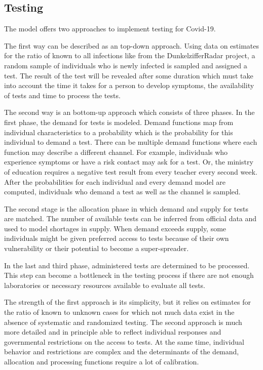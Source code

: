 \subsection{Testing} %
\label{sub:testing}

The model offers two approaches to implement testing for Covid-19.

The first way can be described as an top-down approach. Using data on estimates for the ratio of known to all infections like from the DunkelzifferRadar project\footnotemark, a random sample of individuals who is newly infected is sampled and assigned a test. The result of the test will be revealed after some duration which must take into account the time it takes for a person to develop symptoms, the availability of tests and time to process the tests.


The second way is an bottom-up approach which consists of three phases. In the first phase, the demand for tests is modeled. Demand functions map from individual characteristics to a probability which is the probability for this individual to demand a test. There can be multiple demand functions where each function may describe a different channel. For example, individuals who experience symptoms or have a risk contact may ask for a test. Or, the ministry of education requires a negative test result from every teacher every second week. After the probabilities for each individual and every demand model are computed, individuals who demand a test as well as the channel is sampled.

The second stage is the allocation phase in which demand and supply for tests are matched. The number of available tests can be inferred from official data and used to model shortages in supply. When demand exceeds supply, some individuals might be given preferred access to tests because of their own vulnerability or their potential to become a super-spreader.

In the last and third phase, administered tests are determined to be processed. This step can become a bottleneck in the testing process if there are not enough laboratories or necessary resources available to evaluate all tests.

The strength of the first approach is its simplicity, but it relies on estimates for the ratio of known to unknown cases for which not much data exist in the absence of systematic and randomized testing. The second approach is much more detailed and in principle able to reflect individual responses and governmental restrictions on the access to tests. At the same time, individual behavior and restrictions are complex and the determinants of the demand, allocation and processing functions require a lot of calibration.

